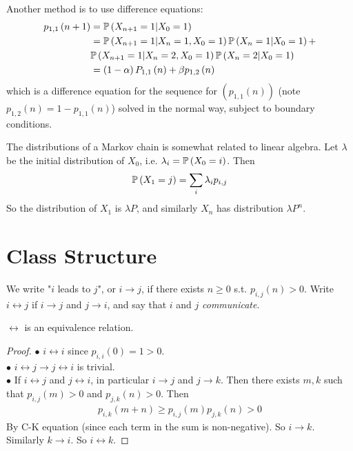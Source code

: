 \documentclass[a4paper]{article}
\begin{document}
\begin{eg}
Another method is to use difference equations:
\begin{equation*}
\begin{aligned}
p_{1,1}\left(n+1\right) &= \P \left(X_{n+1} = 1|X_0=1\right)\\
&= \P \left(X_{n+1} = 1|X_n = 1,X_0=1\right) \P\left(X_n=1|X_0=1\right) + \\&\P\left(X_{n+1}=1|X_n=2,X_0=1\right) \P\left(X_n = 2|X_0=1\right)\\
&= \left(1-\alpha\right) P_{1,1}\left(n\right) + \beta p_{1,2}\left(n\right)
\end{aligned}
\end{equation*}
which is a difference equation for the sequence for $\left(p_{1,1}\left(n\right)\right)$ (note $p_{1,2}\left(n\right) = 1-p_{1,1}\left(n\right)$) solved in the normal way, subject to boundary conditions.
\end{eg}

The distributions of a Markov chain is somewhat related to linear algebra. Let $\lambda$ be the initial distribution of $X_0$, i.e. $\lambda_i = \P \left(X_0 = i\right)$. Then
\begin{equation*}
\begin{aligned}
\P\left(X_1=j\right) = \sum_i \lambda_i p_{i,j}
\end{aligned}
\end{equation*}
So the distribution of $X_1$ is $\lambda P$, and similarly $X_n$ has distribution $\lambda P^n$.

\newpage

\section{Class Structure}
We write "$i$ leads to $j$", or $i \to j$, if there exists $n \geq 0$ s.t. $p_{i,j}\left(n\right) > 0$. Write $i \leftrightarrow j$ if $i\to j$ and $j\to i$, and say that $i$ and $j$ \emph{communicate}.

\begin{prop}
$\leftrightarrow$ is an equivalence relation.
\begin{proof}
$\bullet$ $i \leftrightarrow i$ since $p_{i,i}\left(0\right) = 1 > 0$.\\
$\bullet$ $i \leftrightarrow j \to j \leftrightarrow i$ is trivial.\\
$\bullet$ If $i \leftrightarrow j$ and $j \leftrightarrow i$, in particular $i\to j$ and $j\to k$. Then there exists $m,k$ such that $p_{i,j}\left(m\right) > 0$ and $p_{j,k}\left(n\right) > 0$. Then
\begin{equation*}
\begin{aligned}
p_{i,k}\left(m+n\right) \geq p_{i,j}\left(m\right) p_{j,k}\left(n\right) > 0
\end{aligned}
\end{equation*}
By C-K equation (since each term in the sum is non-negative). So $i\to k$. Similarly $k\to i$. So $i \leftrightarrow k$.
\end{proof}
\end{prop}
\end{document}

